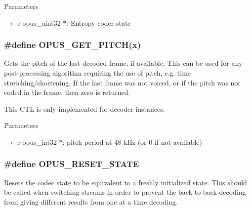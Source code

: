 \begin{DoxyParams}{Parameters}
\item[\mbox{$\rightarrow$} {\em x}]{\ttfamily opus\_\-uint32 $\ast$}: Entropy coder state \end{DoxyParams}
\hypertarget{group__opus__genericctls_gaa89fc25eb35fc31a02b508562dd83820}{
\subsubsection[{OPUS\_\-GET\_\-PITCH}]{\setlength{\rightskip}{0pt plus 5cm}\#define OPUS\_\-GET\_\-PITCH(x)}}
\label{group__opus__genericctls_gaa89fc25eb35fc31a02b508562dd83820}


Gets the pitch of the last decoded frame, if available. This can be used for any post-\/processing algorithm requiring the use of pitch, e.g. time stretching/shortening. If the last frame was not voiced, or if the pitch was not coded in the frame, then zero is returned.

This CTL is only implemented for decoder instances.


\begin{DoxyParams}{Parameters}
\item[\mbox{$\rightarrow$} {\em x}]{\ttfamily opus\_\-int32 $\ast$}: pitch period at 48 kHz (or 0 if not available) \end{DoxyParams}
\hypertarget{group__opus__genericctls_gadc74e4fa8bcdf9994187d52d92207337}{
\subsubsection[{OPUS\_\-RESET\_\-STATE}]{\setlength{\rightskip}{0pt plus 5cm}\#define OPUS\_\-RESET\_\-STATE}}
\label{group__opus__genericctls_gadc74e4fa8bcdf9994187d52d92207337}


Resets the codec state to be equivalent to a freshly initialized state. This should be called when switching streams in order to prevent the back to back decoding from giving different results from one at a time decoding. 